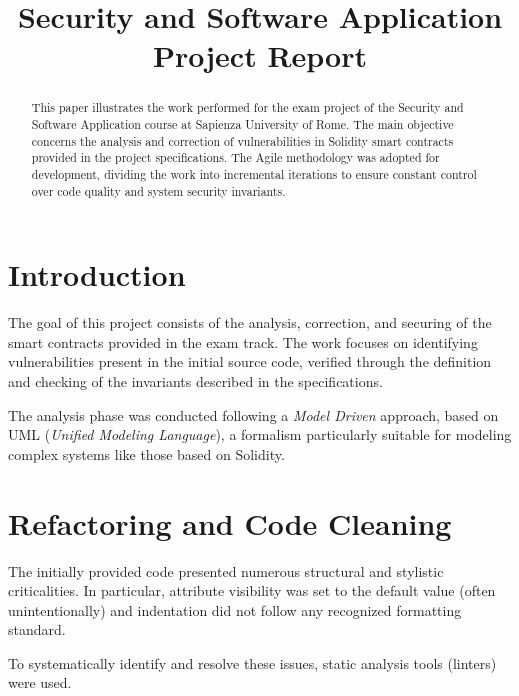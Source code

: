 \documentclass[conference]{IEEEtran}
\begin{document}
\title{Security and Software Application Project Report}

\author{
}

\maketitle

\begin{abstract}
	This paper illustrates the work performed for the exam project of the Security and Software Application course at Sapienza University of Rome.
	The main objective concerns the analysis and correction of vulnerabilities in Solidity smart contracts provided in the project specifications.
	The Agile methodology was adopted for development, dividing the work into incremental iterations to ensure constant control over code quality and system security invariants.
\end{abstract}

\section{Introduction}

The goal of this project consists of the analysis, correction, and securing of the smart contracts provided in the exam track.
The work focuses on identifying vulnerabilities present in the initial source code, verified through the definition and checking of the invariants described in the specifications.

The analysis phase was conducted following a \textit{Model Driven} approach, based on UML (\textit{Unified Modeling Language}), a formalism particularly suitable for modeling complex systems like those based on Solidity.

\section{Refactoring and Code Cleaning}

The initially provided code presented numerous structural and stylistic criticalities.
In particular, attribute visibility was set to the default value (often unintentionally) and indentation did not follow any recognized formatting standard.

To systematically identify and resolve these issues, static analysis tools (linters) were used.
\end{document}
